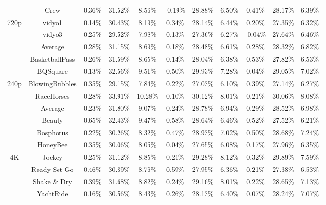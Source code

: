 \documentclass[lettersize,journal]{IEEEtran}
\begin{document}
\begin{table}[!t]
\begin{tabular}{c | c | c   c   c | c   c   c | c   c   c }
	           & Crew           & 0.36\% & 31.52\% & 8.56\% &-0.19\% & 28.88\% & 6.50\% & 0.41\% & 28.17\% & 6.39\% \\  
	     720p  & vidyo1         & 0.14\% & 30.43\% & 8.19\% & 0.34\% & 28.14\% & 6.44\% & 0.20\% & 27.35\% & 6.32\% \\             
	           & vidyo3         & 0.25\% & 29.52\% & 7.98\% & 0.13\% & 27.36\% & 6.27\% &-0.04\% & 27.64\% & 6.46\% \\   
	    \cmidrule[0.75pt]{2-11} 
	           & Average        & 0.28\% & 31.15\% & 8.69\% & 0.18\% & 28.48\% & 6.61\% & 0.28\% & 28.32\% & 6.82\% \\ 
	    \cmidrule[0.75pt]{1-11}  
	           & BasketballPass & 0.26\% & 31.59\% & 8.65\% & 0.14\% & 28.04\% & 6.38\% & 0.53\% & 27.82\% & 6.53\% \\          
	           & BQSquare       & 0.13\% & 32.56\% & 9.51\% & 0.50\% & 29.93\% & 7.28\% & 0.04\% & 29.05\% & 7.02\% \\  
	     240p  & BlowingBubbles & 0.35\% & 29.15\% & 7.84\% & 0.22\% & 27.03\% & 6.10\% & 0.39\% & 27.14\% & 6.27\% \\             
	           & RaceHorses     & 0.28\% & 33.91\% &10.28\% & 0.10\% & 30.12\% & 8.01\% & 0.21\% & 30.06\% & 8.08\% \\   
	    \cmidrule[0.75pt]{2-11} 
	           & Average        & 0.23\% & 31.80\% & 9.07\% & 0.24\% & 28.78\% & 6.94\% & 0.29\% & 28.52\% & 6.98\% \\ 
	    \cmidrule[0.75pt]{1-11} 
	           & Beauty         & 0.65\% & 32.43\% & 9.47\% & 0.58\% & 28.64\% & 6.46\% & 0.52\% & 27.52\% & 6.21\% \\       
              & Bosphorus      & 0.22\% & 30.26\% & 8.32\% & 0.47\% & 28.93\% & 7.02\% & 0.50\% & 28.68\% & 7.24\% \\
	           & HoneyBee       & 0.35\% & 30.06\% & 8.05\% & 0.04\% & 27.65\% & 6.08\% & 0.17\% & 27.96\% & 6.35\% \\  
	     4K      & Jockey         & 0.25\% & 31.12\% & 8.85\% & 0.21\% & 29.28\% & 8.12\% & 0.32\% & 29.89\% & 7.59\% \\               & Ready Set Go   & 0.46\% & 30.89\% & 8.76\% & 0.59\% & 27.95\% & 6.36\% & 0.21\% & 27.38\% & 6.53\% \\
	           & Shake \& Dry    & 0.39\% & 31.68\% &8.82\% & 0.24\% & 29.16\% & 8.01\% & 0.22\% & 28.65\% & 7.13\% \\  
              & YachtRide      & 0.16\% & 30.56\% & 8.43\% & 0.26\% & 28.13\% & 6.40\% & 0.07\% & 28.24\% & 7.07\% \\

\end{tabular}
\end{table}
\end{document}
